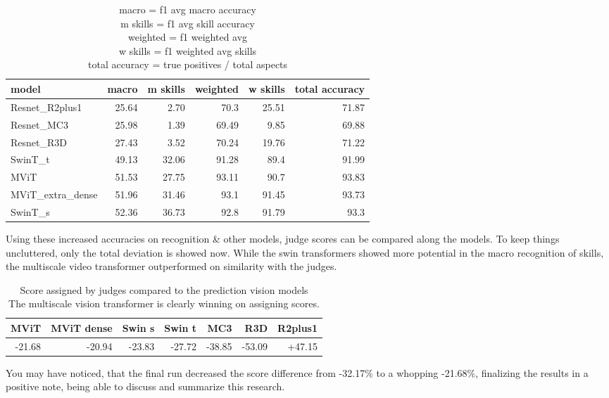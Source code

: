 \begin{table}[h!]
    \begin{tabular}{|l|r|r|r|r|r|}
        \hline model &  macro & m skills & weighted & w skills & total accuracy \\ \hline
        Resnet\_R2plus1	    & 25.64 &	2.70 &	70.3	& 25.51	& 71.87 \\
        Resnet\_MC3	        & 25.98 &	1.39 &	69.49	& 9.85	& 69.88 \\
        Resnet\_R3D	        & 27.43 &	3.52 &	70.24	& 19.76	& 71.22 \\
        SwinT\_t	        & 49.13 &	32.06 &	91.28	& 89.4	& 91.99 \\
        MViT	            & 51.53 &	27.75 &	93.11	& 90.7	& 93.83 \\
        MViT\_extra\_dense	& 51.96 &	31.46 &	93.1	& 91.45	& 93.73 \\
        SwinT\_s	        & 52.36 &	36.73 &	92.8	& 91.79	& 93.3  \\ \hline
\end{tabular}
\caption[Skill recognition comparison on multiple models]{
    macro = f1 avg macro accuracy \\
    m skills = f1 avg skill accuracy \\
    weighted = f1 weighted avg \\
    w skills = f1 weighted avg skills \\
    total accuracy = true positives / total aspects
}
\label{tbl:skill-recognition-model-comparison}
\end{table}


Using these increased accuracies on recognition \& other models, judge scores can be compared along the models.
To keep things uncluttered, only the total deviation is showed now. While the swin transformers showed more potential in the macro recognition of skills, the multiscale video transformer outperformed on similarity with the judges.

\begin{table}[h!]
    \begin{tabular}{|r|r|r|r|r|r|r|}
        \hline
        MViT   & MViT dense  & Swin s & Swin t & MC3    & R3D   & R2plus1 \\ \hline
        -21.68 & -20.94      & -23.83 & -27.72 & -38.85 &-53.09 & +47.15  \\ \hline
    \end{tabular}
    \caption[Judge diff score compared to all models]{Score assigned by judges compared to the prediction vision models \\
    The multiscale vision transformer is clearly winning on assigning scores.}
\end{table}

You may have noticed, that the final run decreased the score difference from -32.17\% to a whopping -21.68\%, finalizing the results in a positive note, being able to discuss and summarize this research.